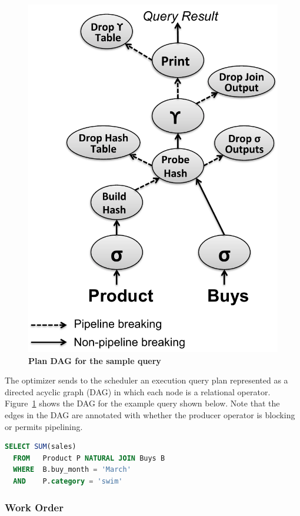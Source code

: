 \begin{figure}
\centering
   \includegraphics[width=.5\textwidth]{system/figures/physical-plan.pdf}
   \caption{\textbf{Plan DAG for the sample query}}
   \label{fig-dag}
\end{figure}

The optimizer sends to the scheduler an execution query plan represented as a directed acyclic graph (DAG) in which each node is a relational operator. Figure~\ref{fig-dag} shows the DAG for the example query shown below. Note that the edges in the DAG are annotated with whether the producer operator is blocking or permits pipelining.


\begin{lstlisting}[language=SQL,upquote=true,
basicstyle=\ttfamily\small,
showstringspaces=false,
keywordstyle=\color{cardinal}\bfseries,
emphstyle=\color{bondiblue}\bfseries,
stringstyle=\color{bondiblue}\bfseries,
emph={SUM}]
  SELECT SUM(sales)
  FROM   Product P NATURAL JOIN Buys B
  WHERE  B.buy_month = 'March'
  AND    P.category = 'swim'
\end{lstlisting}

\subsubsection{Work Order}


